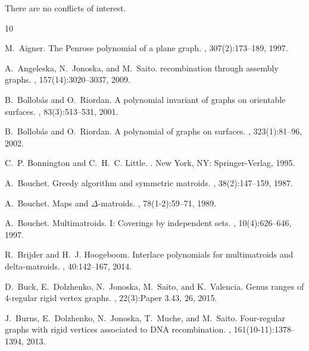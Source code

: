 \documentclass{amsart}
\theoremstyle{definition}
\theoremstyle{remark}
\numberwithin{equation}{section}
\begin{document}
There are no conflicts of interest.





% 

\begin{thebibliography}{10}

M.~Aigner.
\newblock The {P}enrose polynomial of a plane graph.
, 307(2):173--189, 1997.

A.~Angeleska, N.~Jonoska, and M.~Saito.
 recombination through assembly graphs.
, 157(14):3020--3037, 2009.

B.~Bollob{\'a}s and O.~Riordan.
\newblock A polynomial invariant of graphs on orientable surfaces.
, 83(3):513--531, 2001.

B.~Bollob{\'a}s and O.~Riordan.
\newblock A polynomial of graphs on surfaces.
, 323(1):81--96, 2002.

C.~P. Bonnington and C.~H.~C. Little.
.
\newblock New York, NY: Springer-Verlag, 1995.

A.~Bouchet.
\newblock Greedy algorithm and symmetric matroids.
, 38(2):147--159, 1987.

A.~Bouchet.
\newblock Maps and {{\(\Delta\)}}-matroids.
, 78(1-2):59--71, 1989.

A.~Bouchet.
\newblock Multimatroids. {I}: {Coverings} by independent sets.
, 10(4):626--646, 1997.

R.~Brijder and H.~J. Hoogeboom.
\newblock Interlace polynomials for multimatroids and delta-matroids.
, 40:142--167, 2014.

D.~Buck, E.~Dolzhenko, N.~Jonoska, M.~Saito, and K.~Valencia.
\newblock Genus ranges of 4-regular rigid vertex graphs.
, 22(3):Paper 3.43, 26, 2015.

J.~Burns, E.~Dolzhenko, N.~Jonoska, T.~Muche, and M.~Saito.
\newblock Four-regular graphs with rigid vertices associated to {DNA} recombination.
, 161(10-11):1378--1394, 2013.


\end{thebibliography}
\end{document}
